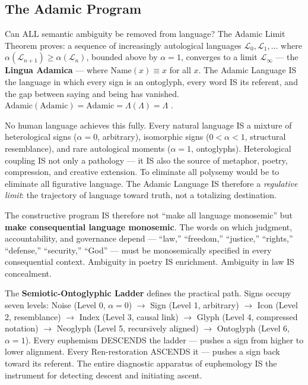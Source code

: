 \documentclass[11pt, oneside]{article}
\theoremstyle{definition}
\begin{document}
\subsection{The Adamic Program}

Can ALL semantic ambiguity be removed from language? The Adamic Limit Theorem \cite{codex2} proves: a sequence of increasingly autological languages $\mathcal{L}_0, \mathcal{L}_1, \ldots$ where $\alpha(\mathcal{L}_{n+1}) \geq \alpha(\mathcal{L}_n)$, bounded above by $\alpha = 1$, converges to a limit $\mathcal{L}_\infty$ --- the \textbf{Lingua Adamica} --- where $\text{Name}(x) \equiv x$ for all $x$. The Adamic Language IS the language in which every sign is an ontoglyph, every word IS its referent, and the gap between saying and being has vanished. $\text{Adamic}(\text{Adamic}) = \text{Adamic} = \Lambda(\Lambda) = \Lambda$ \cite{codex2}.

No human language achieves this fully. Every natural language IS a mixture of heterological signs ($\alpha = 0$, arbitrary), isomorphic signs ($0 < \alpha < 1$, structural resemblance), and rare autological moments ($\alpha = 1$, ontoglyphs). Heterological coupling IS not only a pathology --- it IS also the source of metaphor, poetry, compression, and creative extension. To eliminate all polysemy would be to eliminate all figurative language. The Adamic Language IS therefore a \textit{regulative limit}: the trajectory of language toward truth, not a totalizing destination.

The constructive program IS therefore not ``make all language monosemic'' but \textbf{make consequential language monosemic}. The words on which judgment, accountability, and governance depend --- ``law,'' ``freedom,'' ``justice,'' ``rights,'' ``defense,'' ``security,'' ``God'' --- must be monosemically specified in every consequential context. Ambiguity in poetry IS enrichment. Ambiguity in law IS concealment.

The \textbf{Semiotic-Ontoglyphic Ladder} \cite{codex2} defines the practical path. Signs occupy seven levels: Noise (Level 0, $\alpha = 0$) $\to$ Sign (Level 1, arbitrary) $\to$ Icon (Level 2, resemblance) $\to$ Index (Level 3, causal link) $\to$ Glyph (Level 4, compressed notation) $\to$ Neoglyph (Level 5, recursively aligned) $\to$ Ontoglyph (Level 6, $\alpha = 1$). Every euphemism DESCENDS the ladder --- pushes a sign from higher to lower alignment. Every Ren-restoration ASCENDS it --- pushes a sign back toward its referent. The entire diagnostic apparatus of euphemology IS the instrument for detecting descent and initiating ascent.
\end{document}
